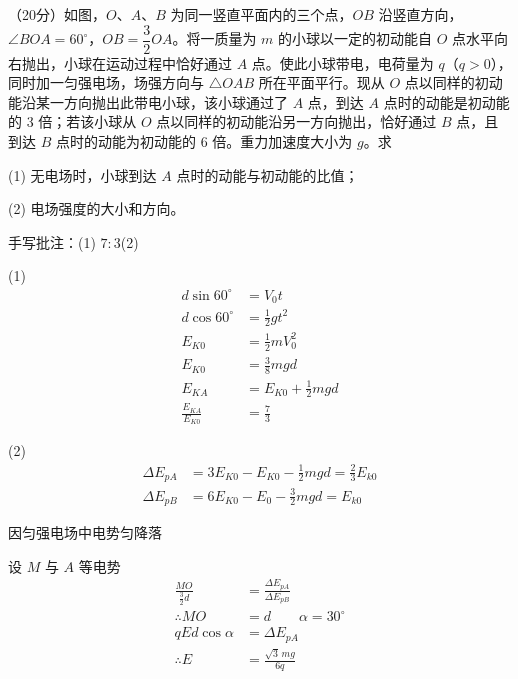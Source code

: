 \begin{problem}
（20分）如图，$O$、$A$、$B$ 为同一竖直平面内的三个点，$OB$ 沿竖直方向，$\angle BOA=60^\circ$，$OB=\dfrac32OA$。将一质量为 $m$ 的小球以一定的初动能自 $O$ 点水平向右抛出，小球在运动过程中恰好通过 $A$ 点。使此小球带电，电荷量为 $q$（$q>0$），同时加一匀强电场，场强方向与 $\triangle OAB$ 所在平面平行。现从 $O$ 点以同样的初动能沿某一方向抛出此带电小球，该小球通过了 $A$ 点，到达 $A$ 点时的动能是初动能的 3 倍；若该小球从 $O$ 点以同样的初动能沿另一方向抛出，恰好通过 $B$ 点，且到达 $B$ 点时的动能为初动能的 6 倍。重力加速度大小为 $g$。求

(1) 无电场时，小球到达 $A$ 点时的动能与初动能的比值；

(2) 电场强度的大小和方向。


手写批注：(1) $7:3$\quad (2) %
\begin{solution}
(1)
\begin{align*}
d\sin60^\circ&=V_0t\\
d\cos60^\circ&=\tfrac12gt^2\\
E_{K0}&=\tfrac12mV_0^2\\
E_{K0}&=\tfrac38mgd\\
E_{KA}&=E_{K0}+\tfrac12mgd\\
\frac{E_{KA}}{E_{K0}}&=\frac73
\end{align*}

(2)
\begin{align*}
\Delta E_{pA}&=3E_{K0}-E_{K0}-\tfrac12mgd=\tfrac23E_{k0}\\
\Delta E_{pB}&=6E_{K0}-E_{0}-\tfrac32mgd=E_{k0}
\end{align*}

因匀强电场中电势匀降落

设 $M$ 与 $A$ 等电势
\begin{align*}
\frac{MO}{\frac32d}&=\frac{\Delta E_{pA}}{\Delta E_{pB}}\\
\therefore MO&=d\qquad \alpha=30^\circ\\
qEd\cos\alpha&=\Delta E_{pA}\\
\therefore E&=\frac{\sqrt{3}\,mg}{6q}
\end{align*}
\end{solution}
\end{problem}
